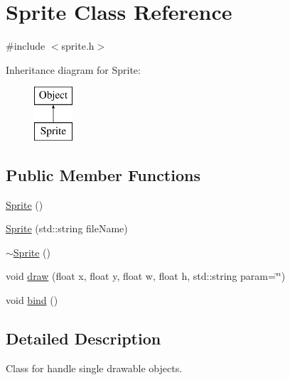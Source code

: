 \hypertarget{class_sprite}{\section{Sprite Class Reference}
\label{class_sprite}
}


{\ttfamily \#include $<$sprite.\-h$>$}

Inheritance diagram for Sprite\-:\begin{figure}[H]
\begin{center}
\leavevmode
\includegraphics[height=2.000000cm]{class_sprite}
\end{center}
\end{figure}
\subsection*{Public Member Functions}
\begin{DoxyCompactItemize}
\item 
\hyperlink{class_sprite_a12cba3ac1868418add3c4d95ce87e615}{Sprite} ()
\item 
\hyperlink{class_sprite_a28604acdc189d2f99b4525e2fa12a585}{Sprite} (std\-::string file\-Name)
\item 
\hyperlink{class_sprite_a8accab430f9d90ae5117b57d67e32b84}{$\sim$\-Sprite} ()
\item 
void \hyperlink{class_sprite_a0d00170fb8cc22361e2c16c4b3818e7e}{draw} (float x, float y, float w, float h, std\-::string param=\char`\"{}\char`\"{})
\item 
void \hyperlink{class_sprite_a3689496f6c44c2c6fd9dd6bd92bf1742}{bind} ()
\end{DoxyCompactItemize}


\subsection{Detailed Description}
Class for handle single drawable objects. 

